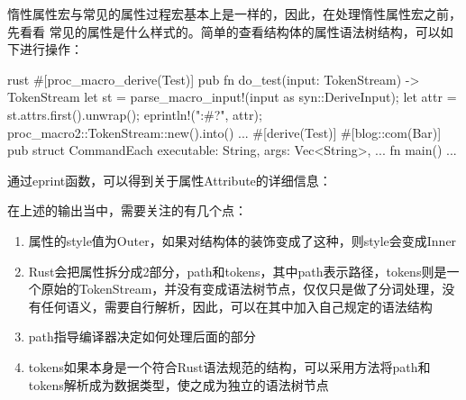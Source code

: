 惰性属性宏与常见的属性过程宏基本上是一样的，因此，在处理惰性属性宏之前，先看看
常见的属性是什么样式的。简单的查看结构体的属性语法树结构，可以如下进行操作：
\begin{code-block}{rust}
#[proc_macro_derive(Test)]
pub fn do_test(input: TokenStream) -> TokenStream {
    let st = parse_macro_input!(input as syn::DeriveInput);
    let attr = st.attrs.first().unwrap();
    eprintln!("{:#?}", attr);
    proc_macro2::TokenStream::new().into()
}
...
#[derive(Test)]
#[blog::com(Bar)]
pub struct CommandEach {
    executable: String,
    args: Vec<String>,
    ...
}
fn main() {
    ...
}
\end{code-block}
通过eprint函数，可以得到关于属性Attribute的详细信息：
在上述的输出当中，需要关注的有几个点：
\begin{enumerate}
  \item 属性的style值为Outer，如果对结构体的装饰变成了这种，则style会变成Inner
  \item Rust会把属性拆分成2部分，path和tokens，其中path表示路径，tokens则是一个原始的TokenStream，并没有变成语法树节点，仅仅只是做了分词处理，没有任何语义，需要自行解析，因此，可以在其中加入自己规定的语法结构
  \item path指导编译器决定如何处理后面的部分
  \item tokens如果本身是一个符合Rust语法规范的结构，可以采用方法将path和tokens解析成为数据类型，使之成为独立的语法树节点
\end{enumerate}

